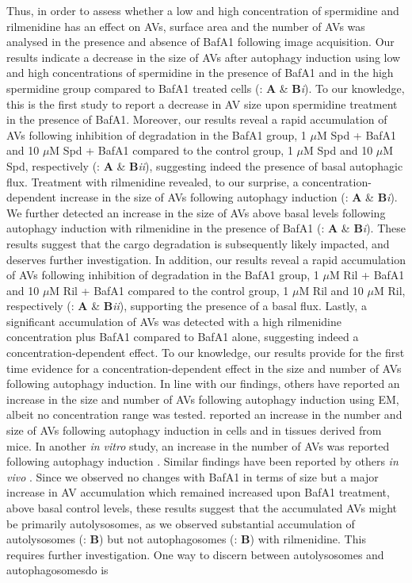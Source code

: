 {Thus, in order to assess whether a low and high concentration of spermidine and rilmenidine has an effect on AVs, surface area and the number of AVs was analysed in the presence and absence of BafA1 following image acquisition. Our results indicate a decrease in the size of AVs after autophagy induction using low and high concentrations of spermidine in the presence of BafA1 and in the high spermidine group compared to BafA1 treated cells (: \textbf{A} \& \textbf{B}\textit{i}). To our knowledge, this is the first study to report a decrease in AV size upon spermidine treatment in the presence of BafA1. Moreover, our results reveal a rapid accumulation of AVs following inhibition of degradation in the BafA1 group, 1 $\mu$M Spd + BafA1 and 10 $\mu$M Spd + BafA1 compared to the control group, 1 $\mu$M Spd and 10 $\mu$M Spd, respectively  (: \textbf{A} \& \textbf{B}\textit{ii}), suggesting indeed the presence of basal autophagic flux.  Treatment with rilmenidine revealed, to our surprise, a concentration-dependent increase in the size of AVs following autophagy induction (: \textbf{A} \& \textbf{B}\textit{i}). We further detected an increase in the size of AVs above basal levels following autophagy induction with rilmenidine in the presence of BafA1 (: \textbf{A} \& \textbf{B}\textit{i}). These results suggest that the cargo degradation is subsequently likely impacted, and deserves further investigation. In addition, our results reveal a rapid accumulation of AVs following inhibition of degradation in the BafA1 group, 1 $\mu$M Ril + BafA1 and 10 $\mu$M Ril + BafA1 compared to the control group, 1 $\mu$M Ril and 10 $\mu$M Ril, respectively (: \textbf{A} \& \textbf{B}\textit{ii}), supporting the presence of a basal flux. Lastly, a significant accumulation of AVs was detected with a high rilmenidine concentration plus BafA1 compared to BafA1 alone, suggesting indeed a concentration-dependent effect.  To our knowledge, our results provide for the first time evidence for a concentration-dependent effect in the size and number of AVs following autophagy induction.  In line with our findings, others have reported an increase in the size and number of AVs following autophagy induction using EM, albeit no concentration range was tested. \citet{Mizushima2004a} reported an increase in the number and size of AVs following autophagy induction in cells and in tissues derived from mice. In another \textit{in vitro} study, an increase in the number of AVs was reported  following autophagy induction \citep{Lum2005}. Similar findings have been reported by others \textit{in vivo} \citep{Alirezaei2010,Ericsson1969,Mizushima2004a}. Since we observed no changes with BafA1 in terms of size but a major increase in AV accumulation which remained increased upon BafA1 treatment, above basal control levels, these results suggest that the accumulated AVs might be primarily autolysosomes, as we observed substantial accumulation of autolysosomes (: \textbf{B}) but not autophagosomes (: \textbf{B}) with rilmenidine. This requires further investigation. One way to discern between autolysosomes and autophagosomesdo is }
